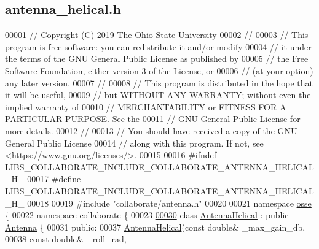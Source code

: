 \hypertarget{antenna__helical_8h_source}{}\subsection{antenna\+\_\+helical.\+h}
\label{antenna__helical_8h_source}

\begin{DoxyCode}
00001 \textcolor{comment}{// Copyright (C) 2019 The Ohio State University}
00002 \textcolor{comment}{//}
00003 \textcolor{comment}{// This program is free software: you can redistribute it and/or modify}
00004 \textcolor{comment}{// it under the terms of the GNU General Public License as published by}
00005 \textcolor{comment}{// the Free Software Foundation, either version 3 of the License, or}
00006 \textcolor{comment}{// (at your option) any later version.}
00007 \textcolor{comment}{//}
00008 \textcolor{comment}{// This program is distributed in the hope that it will be useful,}
00009 \textcolor{comment}{// but WITHOUT ANY WARRANTY; without even the implied warranty of}
00010 \textcolor{comment}{// MERCHANTABILITY or FITNESS FOR A PARTICULAR PURPOSE.  See the}
00011 \textcolor{comment}{// GNU General Public License for more details.}
00012 \textcolor{comment}{//}
00013 \textcolor{comment}{// You should have received a copy of the GNU General Public License}
00014 \textcolor{comment}{// along with this program.  If not, see <https://www.gnu.org/licenses/>.}
00015 
00016 \textcolor{preprocessor}{#ifndef LIBS\_COLLABORATE\_INCLUDE\_COLLABORATE\_ANTENNA\_HELICAL\_H\_}
00017 \textcolor{preprocessor}{#define LIBS\_COLLABORATE\_INCLUDE\_COLLABORATE\_ANTENNA\_HELICAL\_H\_}
00018 
00019 \textcolor{preprocessor}{#include "collaborate/antenna.h"}
00020 
00021 \textcolor{keyword}{namespace }\hyperlink{namespaceosse}{osse} \{
00022 \textcolor{keyword}{namespace }collaborate \{
00023 
\hyperlink{classosse_1_1collaborate_1_1_antenna_helical}{00030} \textcolor{keyword}{class }\hyperlink{classosse_1_1collaborate_1_1_antenna_helical}{AntennaHelical} : \textcolor{keyword}{public} \hyperlink{classosse_1_1collaborate_1_1_antenna}{Antenna} \{
00031  \textcolor{keyword}{public}:
00037   \hyperlink{classosse_1_1collaborate_1_1_antenna_helical_a2984fb54d37462763ca923c0ba5d4893}{AntennaHelical}(\textcolor{keyword}{const} \textcolor{keywordtype}{double}& \_max\_gain\_db,
00038                  \textcolor{keyword}{const} \textcolor{keywordtype}{double}& \_roll\_rad,

\end{DoxyCode}
